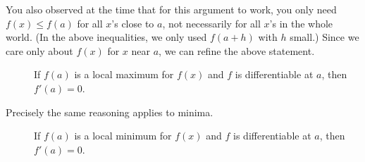 You also observed at the time that for this argument to work, you only
need $f(x)\le f(a)$ for all $x$'s close to $a$, not necessarily for all
$x$'s in the whole world. (In the above inequalities, we only used
$f(a+h)$ with $h$ small.) Since we care only about $f(x)$ for $x$ near $a$, 
we can refine the above statement.
\begin{description}
\item[\hskip0.25in] 
If $f(a)$ is a local maximum for $f(x)$
and $f$ is differentiable at $a$, then $f'(a)=0$.
\end{description}
Precisely the same reasoning applies to minima.
\begin{description}
\item[\hskip0.25in] 
If $f(a)$ is a local minimum for $f(x)$
and $f$ is differentiable at $a$, then $f'(a)=0$.
\end{description}

